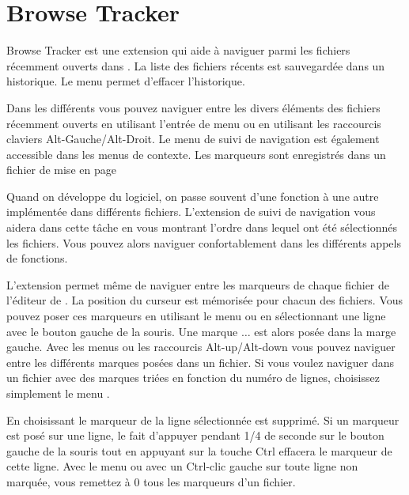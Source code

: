 \section{Browse Tracker}\label{sec:browsetracker}

Browse Tracker est une extension qui aide à naviguer parmi les fichiers récemment ouverts dans \codeblocks. La liste des fichiers récents est sauvegardée dans un historique. Le menu  permet d'effacer l'historique.

Dans les différents  vous pouvez naviguer entre les divers éléments des fichiers récemment ouverts en utilisant l'entrée de menu  ou en utilisant les raccourcis claviers Alt-Gauche/Alt-Droit. Le menu de suivi de navigation est également accessible dans les menus de contexte. Les marqueurs sont enregistrés dans un fichier de mise en page 

Quand on développe du logiciel, on passe souvent d'une fonction à une autre implémentée dans différents fichiers. L'extension de suivi de navigation vous aidera dans cette tâche en vous montrant l'ordre dans lequel ont été sélectionnés les fichiers. Vous pouvez alors naviguer confortablement dans les différents appels de fonctions.

L'extension permet même de naviguer entre les marqueurs de chaque fichier de l'éditeur de \codeblocks. La position du curseur est mémorisée pour chacun des fichiers. Vous pouvez poser ces marqueurs en utilisant le menu  ou en sélectionnant une ligne avec le bouton gauche de la souris. Une marque $\ldots$ est alors posée dans la marge gauche. Avec les menus  ou les raccourcis Alt-up/Alt-down vous pouvez naviguer entre les différents marques posées dans un fichier. Si vous voulez naviguer dans un fichier avec des marques triées en fonction du numéro de lignes, choisissez simplement le menu .

En choisissant  le marqueur de la ligne sélectionnée est supprimé. Si un marqueur est posé sur une ligne, le fait d'appuyer pendant 1/4 de seconde sur le bouton gauche de la souris tout en appuyant sur la touche Ctrl effacera le marqueur de cette ligne. Avec le menu  ou avec un Ctrl-clic gauche sur toute ligne non marquée, vous remettez à 0 tous les marqueurs d'un fichier.


